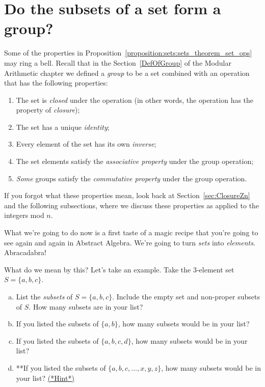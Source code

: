 \section{Do the subsets of a set form a group? \quad
{}}\label{SetGroup} 
Some of the properties in Proposition~\ref{proposition:sets:sets_theorem_set_ops} may ring a bell. Recall that in the Section~\ref{DefOfGroup} of the Modular Arithmetic chapter  we defined a \emph{group} to be a set combined with an operation that has the following properties:
\begin{enumerate}
\item
The set is \emph{closed} under the operation (in other words, the operation has the property of \emph{closure});
\item
The set has  a unique \emph{identity};
\item
Every element of the set has its own \emph{inverse};
\item
The set elements satisfy the \emph{associative property} under the group operation;
\item
\emph{Some} groups satisfy the \emph{commutative property} under the group operation.
\end{enumerate}

\noindent
If you forgot what these properties mean, look back at Section~\ref{sec:ClosureZn} and the following subsections, where we discuss these properties as applied to the integers mod $n$.

What we're going to do now is a first taste of a magic recipe that you're going to see again and again in Abstract Algebra. We're going to turn \emph{sets} into \emph{elements}. Abracadabra!

What do we mean by this? Let's take an example. Take the 3-element set $S = \{a,b,c\}$. 

\begin{exercise}{31}
\begin{enumerate}[(a)]
\item
List the \emph{subsets} of $S =  \{a,b,c\}$. Include the empty set and non-proper subsets of $S$. How many subsets are in your list?
\item
If you listed the subsets of $\{a,b\}$, how many subsets would be in your list?
\item
If you listed the subsets of $\{a,b,c,d\}$, how many subsets would be in your list?
\item
**If you listed the subsets of $\{a,b,c,\ldots,x,y,z\}$, how many subsets would be in your list?
\hyperref[sec:set_chapter:hints]{(*Hint*)}
\end{enumerate}
\end{exercise}

